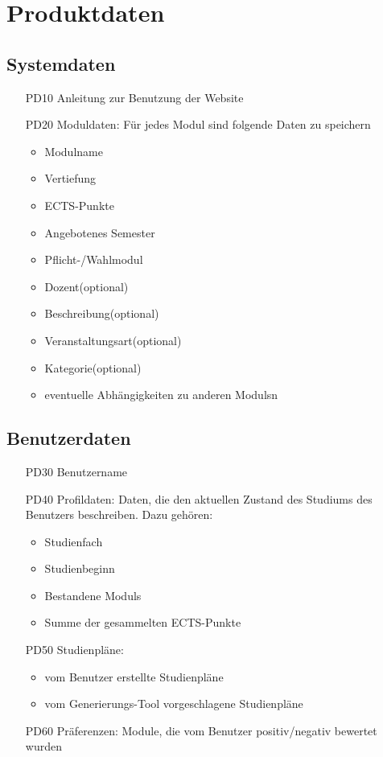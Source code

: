 \section{Produktdaten}

\subsection{Systemdaten}
	
\begin{itemize}[nosep]
	\item[PD10]Anleitung zur Benutzung der Website
	\item[PD20] \gls{Modul}daten: Für jedes \gls{Modul} sind folgende Daten zu speichern	
	\begin{itemize}
		\item \gls{Modul}name
		\item Vertiefung
		\item \gls{ECTS-Punkte}
		\item Angebotenes Semester	
		\item Pflicht-/Wahlmodul 	
		\item Dozent(optional)
		\item Beschreibung(optional)
		\item Veranstaltungsart(optional)
		\item Kategorie(optional)
		\item eventuelle Abhängigkeiten zu anderen \glspl{Modul}n
	\end{itemize}
	 
\end{itemize}

\subsection{Benutzerdaten}
\label{subsec:product_data-benutzerdaten}  %

\begin{itemize}[nosep]
	\item[PD30]Benutzername
	\item[PD40]Profildaten: Daten, die den aktuellen Zustand des Studiums des Benutzers beschreiben. Dazu gehören: 
	\begin{itemize}
		\item Studienfach
		\item Studienbeginn	
		\item Bestandene \glspl{Modul} 
		\item Summe der gesammelten \gls{ECTS-Punkte}
	\end{itemize}
	\item[PD50] Studienpläne:
	\begin{itemize}
		\item 	vom Benutzer erstellte Studienpläne 
		\item	vom \gls{Generierungs-Tool} vorgeschlagene Studienpläne 
	\end{itemize} 
	\item[PD60] Präferenzen: Module, die vom Benutzer positiv/negativ bewertet wurden
\end{itemize}